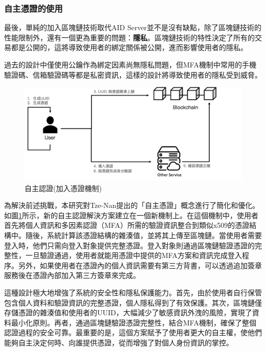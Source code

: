 \subsubsection{自主憑證的使用}
最後，單純的加入區塊鏈技術取代AID Server並不是沒有缺點，除了區塊鏈技術的性能限制外，還有一個更為重要的問題：\textbf{隱私}。區塊鏈技術的特性決定了所有的交易都是公開的，這將導致使用者的綁定關係被公開，進而影響使用者的隱私。

過去的設計中僅使用公鑰作為綁定因素尚無隱私問題，但MFA機制中常用的手機驗證碼、信箱驗證碼等都是私密資訊，這樣的設計將導致使用者的隱私受到威脅。

\begin{figure}
  \centering
  \includegraphics[width=\linewidth]{figures/new-aid-login.png}
  \caption{自主認證(加入憑證機制)}
  \label{fig:new-aid-login}
\end{figure}
為解決前述挑戰，本研究對Tze-Nan\cite{NTU202102846}提出的「自主憑證」概念進行了簡化和優化。如圖\ref{fig:new-aid-login}所示，新的自主認證解決方案建立在一個新機制上。在這個機制中，使用者首先將個人資訊和多因素認證（MFA）所需的驗證資訊整合到類似x509的憑證結構中。隨後，系統計算該憑證結構的雜湊值，並將其上傳至區塊鏈。當使用者需要登入時，他們只需向登入對象提供完整憑證。登入對象則通過區塊鏈驗證憑證的完整性，一旦驗證通過，使用者就能用憑證中提供的MFA方案和資訊完成登入程序。另外，如果使用者在憑證內的個人資訊需要有第三方背書，可以透過追加簽章服務後在憑證內部加入第三方簽章來完成。

這種設計極大地增強了系統的安全性和隱私保護能力。首先，由於使用者自行保管包含個人資料和驗證資訊的完整憑證，個人隱私得到了有效保護。其次，區塊鏈僅存儲憑證的雜湊值和使用者的UUID，大幅減少了敏感資訊外洩的風險，實現了資料最小化原則。再者，通過區塊鏈驗證憑證完整性，結合MFA機制，確保了整個認證過程的安全可靠。最重要的是，這個方案賦予了使用者更大的自主權，使他們能夠自主決定何時、向誰提供憑證，從而增強了對個人身份資訊的掌控。
